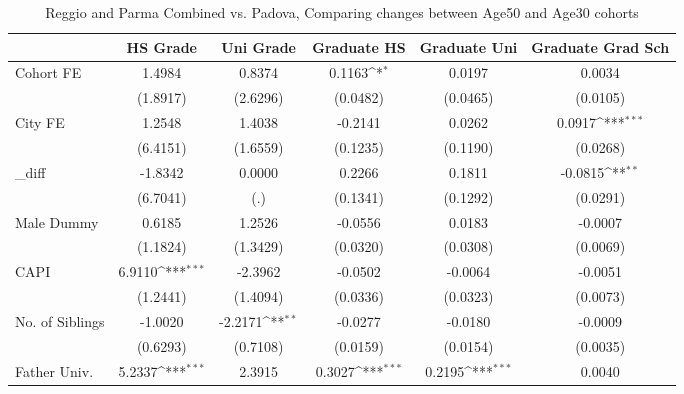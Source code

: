 \begin{table}[htbp]\centering
\def\sym#1{\ifmmode^{#1}\else\(^{#1}\)\fi}
\caption{Reggio and Parma Combined vs. Padova, Comparing changes between Age50 and Age30 cohorts}
\begin{tabular}{l*{5}{c}}
\toprule
            &\multicolumn{1}{c}{HS Grade}&\multicolumn{1}{c}{Uni Grade}&\multicolumn{1}{c}{Graduate HS}&\multicolumn{1}{c}{Graduate Uni}&\multicolumn{1}{c}{Graduate Grad Sch}\\
\midrule
Cohort FE   &      1.4984         &      0.8374         &      0.1163\sym{*}  &      0.0197         &      0.0034         \\
            &    (1.8917)         &    (2.6296)         &    (0.0482)         &    (0.0465)         &    (0.0105)         \\
\addlinespace
City FE     &      1.2548         &      1.4038         &     -0.2141         &      0.0262         &      0.0917\sym{***}\\
            &    (6.4151)         &    (1.6559)         &    (0.1235)         &    (0.1190)         &    (0.0268)         \\
\addlinespace
\_diff       &     -1.8342         &      0.0000         &      0.2266         &      0.1811         &     -0.0815\sym{**} \\
            &    (6.7041)         &         (.)         &    (0.1341)         &    (0.1292)         &    (0.0291)         \\
\addlinespace
Male Dummy  &      0.6185         &      1.2526         &     -0.0556         &      0.0183         &     -0.0007         \\
            &    (1.1824)         &    (1.3429)         &    (0.0320)         &    (0.0308)         &    (0.0069)         \\
\addlinespace
CAPI        &      6.9110\sym{***}&     -2.3962         &     -0.0502         &     -0.0064         &     -0.0051         \\
            &    (1.2441)         &    (1.4094)         &    (0.0336)         &    (0.0323)         &    (0.0073)         \\
\addlinespace
No. of Siblings&     -1.0020         &     -2.2171\sym{**} &     -0.0277         &     -0.0180         &     -0.0009         \\
            &    (0.6293)         &    (0.7108)         &    (0.0159)         &    (0.0154)         &    (0.0035)         \\
\addlinespace
Father Univ.&      5.2337\sym{***}&      2.3915         &      0.3027\sym{***}&      0.2195\sym{***}&      0.0040         \\

\end{tabular}
\end{table}
